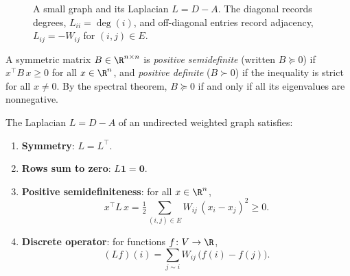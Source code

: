 \begin{figure}[h]
\centering
{}
\caption[The graph Laplacian]{A small graph and its Laplacian $L = D - A$. The
diagonal records degrees, $L_{ii} = \deg(i)$, and off-diagonal entries record
adjacency, $L_{ij} = -W_{ij}$ for $(i,j) \in E$.}
\label{fig:graphs:laplacian}
\end{figure}

\begin{definition}
\label{def:graphs:psd}
A symmetric matrix $B \in \R^{n \times n}$ is \emph{positive semidefinite}
(written $B \succeq 0$) if $x^\top B\, x \ge 0$ for all $x \in \R^n$, and
\emph{positive definite} ($B \succ 0$) if the inequality is strict for all
$x \neq 0$. By the spectral theorem, $B \succeq 0$ if and only if all its
eigenvalues are nonnegative.
\end{definition}

\begin{proposition}
\label{prop:graphs:laplacian-algebra}
The Laplacian $L = D - A$ of an undirected weighted graph satisfies:
\begin{enumerate}
  \item \textbf{Symmetry}: $L = L^\top$.
  \item \textbf{Rows sum to zero}: $L \mathbf{1} = \mathbf{0}$.
  \item \textbf{Positive semidefiniteness}: for all $x \in \R^n$,
        \[
          x^\top L\, x = \tfrac12 \sum_{(i,j) \in E} W_{ij}\,(x_i - x_j)^2 \ge 0 .
        \]
  \item \textbf{Discrete operator}: for functions $f \colon V \to \R$,
        \[
          (L f)(i) = \sum_{j \sim i} W_{ij}\,\big(f(i) - f(j)\big).
        \]
\end{enumerate}
\end{proposition}

